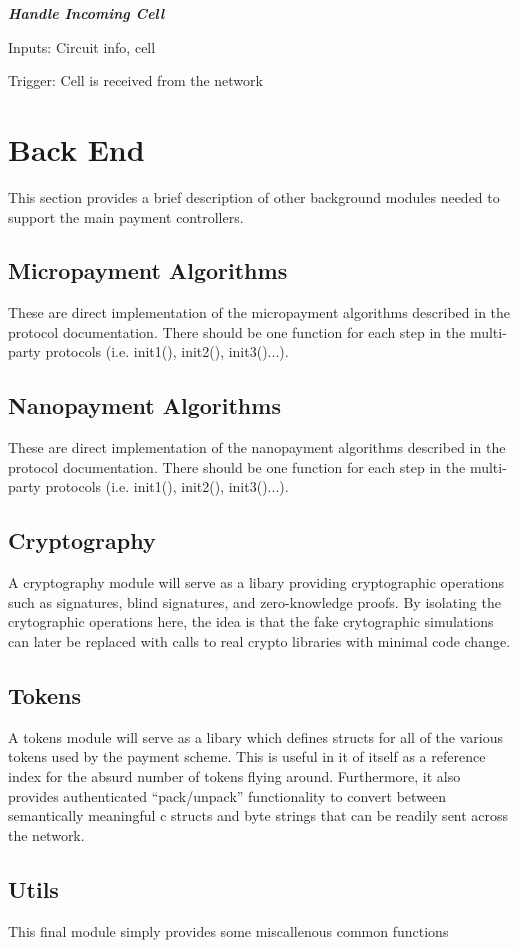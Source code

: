 \documentclass{article}
\begin{document}
\textbf{\emph{Handle Incoming Cell}}

Inputs: Circuit info, cell

Trigger: Cell is received from the network

\section{Back End}

This section provides a brief description of other background modules needed to
support the main payment controllers.

\subsection{Micropayment  Algorithms}

These are direct implementation of the micropayment algorithms described in the
protocol documentation. There should be one function for each step in the
multi-party protocols (i.e. init1(), init2(), init3()...).

\subsection{Nanopayment Algorithms}

These are direct implementation of the nanopayment algorithms described in the
protocol documentation. There should be one function for each step in the
multi-party protocols (i.e. init1(), init2(), init3()...).

\subsection{Cryptography}

A cryptography module will serve as a libary providing cryptographic operations such as
signatures, blind signatures, and zero-knowledge proofs. By isolating the
crytographic operations here, the idea is that the fake crytographic simulations
can later be replaced with calls to real crypto libraries with minimal code
change.

\subsection{Tokens}

A tokens  module will serve as a libary which defines structs for all of the various
tokens used by the payment scheme. This is useful in it of itself as a reference
index for the absurd number of tokens flying around. Furthermore, it also
provides authenticated ``pack/unpack'' functionality to convert between
semantically meaningful c structs and byte strings that can be readily sent
across the network.

\subsection{Utils}

This final module simply provides some miscallenous common functions
\end{document}
